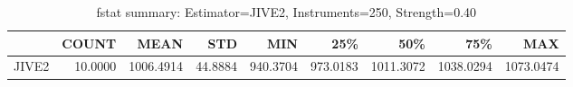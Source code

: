 \begin{table}[ht]
\centering
\caption{fstat summary: Estimator=JIVE2, Instruments=250, Strength=0.40}
\begin{tabular}{lrrrrrrrr}
\toprule
 & COUNT & MEAN & STD & MIN & 25\% & 50\% & 75\% & MAX \\
\midrule
JIVE2 & 10.0000 & 1006.4914 & 44.8884 & 940.3704 & 973.0183 & 1011.3072 & 1038.0294 & 1073.0474 \\
\bottomrule
\end{tabular}
\end{table}
